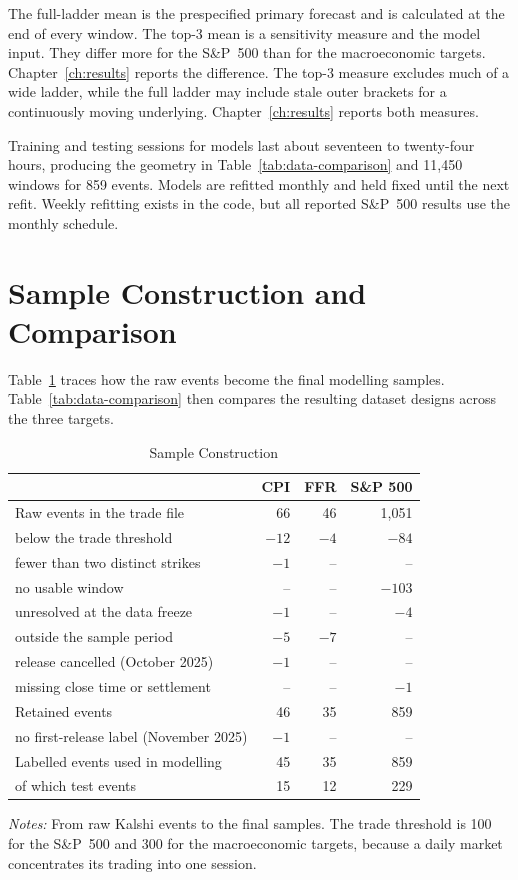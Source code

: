 \documentclass[12pt,a4paper]{report}
\newcommand{\tablenote}[1]{%
  \par\vspace{0.4em}%
  \begin{minipage}{0.9\textwidth}%
  \footnotesize\raggedright\emph{Notes:} #1%
  \end{minipage}%
}
\begin{document}
The full-ladder mean is the prespecified primary forecast and is calculated at
the end of every window. The top-3 mean is a sensitivity measure and the model
input. They differ more for the S\&P~500 than for the macroeconomic targets.
Chapter~\ref{ch:results} reports the difference.
The top-3 measure excludes much of a wide ladder, while the full ladder may
include stale outer brackets for a continuously moving underlying.
Chapter~\ref{ch:results} reports both measures.

Training and testing sessions for models last about seventeen to twenty-four hours, producing the geometry in
Table~\ref{tab:data-comparison} and 11{,}450 windows for 859 events. Models are
refitted monthly and held fixed until the next refit. Weekly refitting exists
in the code, but all reported S\&P~500 results use the monthly schedule.


\section{Sample Construction and Comparison}
\label{sec:data-samples}

Table~\ref{tab:data-exclusions} traces how the raw events become the final
modelling samples. Table~\ref{tab:data-comparison} then compares the resulting
dataset designs across the three targets.

\begin{table}[H]
\centering
\caption{Sample Construction}
\label{tab:data-exclusions}
\small
\begin{tabular}{@{}lrrr@{}}
\toprule
 & CPI & FFR & S\&P 500 \\
\midrule
Raw events in the trade file & 66 & 46 & 1{,}051 \\
\quad below the trade threshold & $-12$ & $-4$ & $-84$ \\
\quad fewer than two distinct strikes & $-1$ & -- & -- \\
\quad no usable window & -- & -- & $-103$ \\
\quad unresolved at the data freeze & $-1$ & -- & $-4$ \\
\quad outside the sample period & $-5$ & $-7$ & -- \\
\quad release cancelled (October 2025) & $-1$ & -- & -- \\
\quad missing close time or settlement & -- & -- & $-1$ \\
Retained events & 46 & 35 & 859 \\
\quad no first-release label (November 2025) & $-1$ & -- & -- \\
Labelled events used in modelling & 45 & 35 & 859 \\
\quad of which test events & 15 & 12 & 229 \\
\bottomrule
\end{tabular}
\tablenote{From raw Kalshi events to the final samples. The trade threshold is
100 for the S\&P~500 and 300 for the macroeconomic targets, because a daily
market concentrates its trading into one session.}
\end{table}
\end{document}
